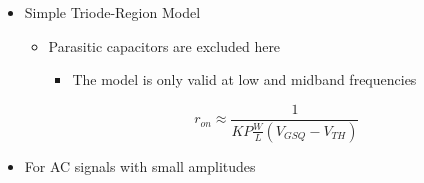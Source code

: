 \begin{itemize}
    \begin{itemize}

      \item Simple Triode-Region Model

        \begin{itemize}

          \item Parasitic capacitors are excluded here

            \begin{itemize}

              \item The model is only valid at low and midband frequencies

            \end{itemize}

            $$r_{on}\approx\frac{1}{KP\frac{W}{L}(V_{GSQ}-V_{TH})}$$

        \end{itemize}

      \item For AC signals with small amplitudes

    \end{itemize}

\end{itemize}



